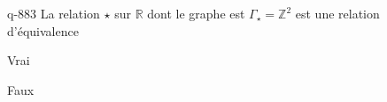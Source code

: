 \begin{truefalse}{q-883}
La relation $\star$ sur $\mathbb R$ dont le graphe est $\Gamma_\star=\mathbb Z^2$ est une relation d'équivalence
\item Vrai
\item* Faux
\end{truefalse}

